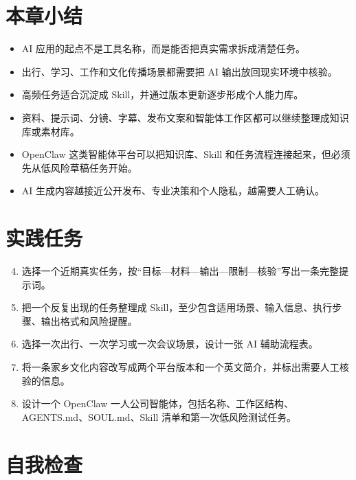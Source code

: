 \section*{本章小结}

\begin{itemize}
    \item AI 应用的起点不是工具名称，而是能否把真实需求拆成清楚任务。
    \item 出行、学习、工作和文化传播场景都需要把 AI 输出放回现实环境中核验。
    \item 高频任务适合沉淀成 Skill，并通过版本更新逐步形成个人能力库。
    \item 资料、提示词、分镜、字幕、发布文案和智能体工作区都可以继续整理成知识库或素材库。
    \item OpenClaw 这类智能体平台可以把知识库、Skill 和任务流程连接起来，但必须先从低风险草稿任务开始。
    \item AI 生成内容越接近公开发布、专业决策和个人隐私，越需要人工确认。
\end{itemize}


\section*{实践任务}

\begin{enumerate}
    \setcounter{enumi}{3}
    \item 选择一个近期真实任务，按“目标—材料—输出—限制—核验”写出一条完整提示词。
    \item 把一个反复出现的任务整理成 Skill，至少包含适用场景、输入信息、执行步骤、输出格式和风险提醒。
    \item 选择一次出行、一次学习或一次会议场景，设计一张 AI 辅助流程表。
    \item 将一条家乡文化内容改写成两个平台版本和一个英文简介，并标出需要人工核验的信息。
    \item 设计一个 OpenClaw 一人公司智能体，包括名称、工作区结构、AGENTS.md、SOUL.md、Skill 清单和第一次低风险测试任务。
\end{enumerate}


\section*{自我检查}

